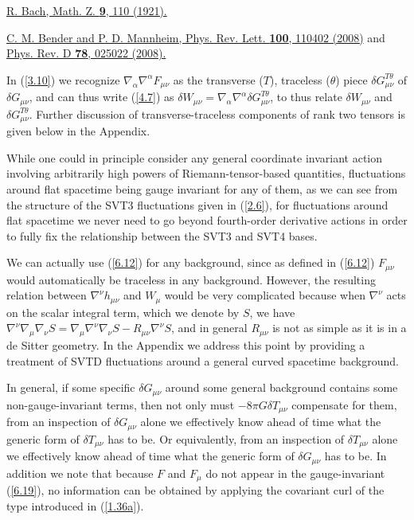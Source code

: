 \documentclass[aps,onecolumn,10pt]{revtex4}
\numberwithin{equation}{section}
\numberwithin{equation}{section}
\begin{document}
\begin{thebibliography}{99}
 \href{https://doi.org/10.1007/BF01378338}{R. Bach, Math. Z.  \textbf{9}, 110 (1921).}

  \href{https://doi.org/10.1103/PhysRevLett.100.110402}{C. M. Bender and P. D. Mannheim, Phys. Rev. Lett. {\bf 100}, 110402 (2008)} and \href{https://doi.org/10.1103/PhysRevD.78.025022} {Phys. Rev. D {\bf 78}, 025022 (2008).}


 In (\ref{3.10}) we recognize $\nabla_{\alpha}\nabla^{\alpha}F_{\mu\nu}$ as the transverse ($T$), traceless ($\theta$) piece $\delta G_{\mu\nu}^{T\theta}$ of $\delta G_{\mu\nu}$, and can thus write (\ref{4.7}) as $\delta W_{\mu\nu}=\nabla_{\alpha}\nabla^{\alpha}\delta G_{\mu\nu}^{T\theta}$, to thus relate $\delta W_{\mu\nu}$ and $\delta G_{\mu\nu}^{T\theta}$. Further discussion of transverse-traceless components of rank two tensors is given below in the Appendix.

 While one could in principle consider any general coordinate invariant action involving arbitrarily high powers of Riemann-tensor-based quantities, fluctuations around flat spacetime being  gauge invariant for any of them, as we can see from the structure of the SVT3 fluctuations given in (\ref{2.6}), for fluctuations around flat spacetime we never need to go beyond fourth-order derivative actions in order to fully fix the relationship between the SVT3 and SVT4 bases.

 We can actually use (\ref{6.12}) for any background, since  as defined in (\ref{6.12}) $F_{\mu\nu}$ would automatically be traceless in any background. However, the resulting relation between $\nabla^{\nu}h_{\mu\nu}$ and $W_{\mu}$ would be very complicated because when $\nabla^{\nu}$ acts on the scalar integral  term, which we denote by $S$,  we have $\nabla^{\nu}\nabla_{\mu}\nabla_{\nu}S=\nabla_{\mu}\nabla^{\nu}\nabla_{\nu}S-R_{\mu\nu}\nabla^{\nu}S$, and in general $R_{\mu\nu}$ is not as simple as it is in a de Sitter geometry. In the Appendix we address this point by providing a treatment of SVTD fluctuations around a general curved spacetime background.



 In general, if some specific $\delta G_{\mu\nu}$ around some general background contains some non-gauge-invariant terms, then not only must $-8\pi G\delta T_{\mu\nu}$ compensate for them, from an inspection of $\delta G_{\mu\nu}$ alone we effectively know ahead of time what the generic form of $ \delta T_{\mu\nu}$ has to be. Or equivalently, from an inspection of $\delta T_{\mu\nu}$ alone we effectively know ahead of time what the generic form of $ \delta G_{\mu\nu}$ has to be. In addition we note that because $F$ and $F_{\mu}$ do not appear in the gauge-invariant (\ref{6.19}), no information can be obtained  by applying the covariant curl of the type introduced in (\ref{1.36a}).



\end{thebibliography}
\end{document}
